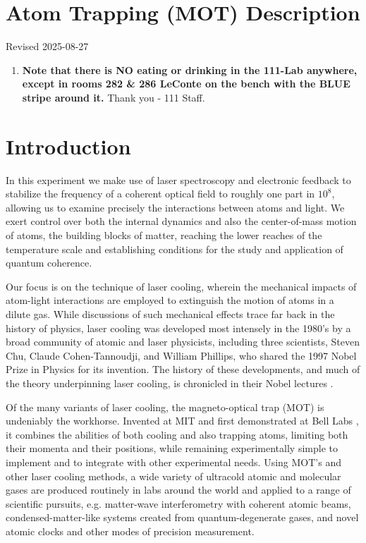 \documentclass{../lab}
\begin{document}
\maketitle

\tableofcontents

\section{Atom Trapping (MOT) Description}

Revised 2025-08-27
 
\begin{enumerate}
    \item \textbf{Note that there is NO eating or drinking in the 111-Lab anywhere, except in rooms 282 \& 286 LeConte on the bench with the BLUE stripe around it.} Thank you - 111 Staff.
\end{enumerate}

\section{Introduction}

In this experiment we make use of laser spectroscopy and electronic feedback to stabilize the frequency of a coherent optical field to roughly one part in $10^8$, allowing us to examine precisely the interactions between atoms and light. We exert control over both the internal dynamics and also the center-of-mass motion of atoms, the building blocks of matter, reaching the lower reaches of the temperature scale and establishing conditions for the study and application of quantum coherence.

Our focus is on the technique of laser cooling, wherein the mechanical impacts of atom-light interactions are employed to extinguish the motion of atoms in a dilute gas. While discussions of such mechanical effects trace far back in the history of physics, laser cooling was developed most intensely in the 1980’s by a broad community of atomic and laser physicists, including three scientists, Steven Chu, Claude Cohen-Tannoudji, and William Phillips, who shared the 1997 Nobel Prize in Physics for its invention. The history of these developments, and much of the theory underpinning laser cooling, is chronicled in their Nobel lectures \cite{Chu,Cohen-Tannoudji,Phillips}.

Of the many variants of laser cooling, the magneto-optical trap (MOT) is undeniably the workhorse. Invented at MIT and first demonstrated at Bell Labs \cite{Raab}, it combines the abilities of both cooling and also trapping atoms, limiting both their momenta and their positions, while remaining experimentally simple to implement and to integrate with other experimental needs. Using MOT’s and other laser cooling methods, a wide variety of ultracold atomic and molecular gases are produced routinely in labs around the world and applied to a range of scientific pursuits, e.g. matter-wave interferometry with coherent atomic beams, condensed-matter-like systems created from quantum-degenerate gases, and novel atomic clocks and other modes of precision measurement.
\end{document}
